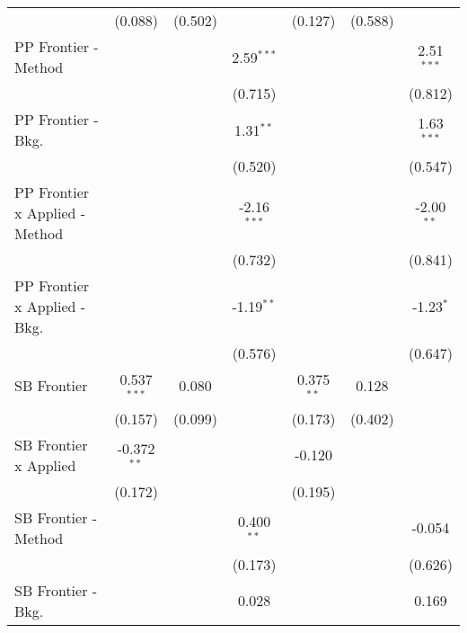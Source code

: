 \begin{tabular}{lcccccc}
                                  & (0.088)        & (0.502)       &               & (0.127)        & (0.588)       &   \\   
   PP Frontier - Method           &                &               & 2.59$^{***}$  &                &               & 2.51$^{***}$\\   
                                  &                &               & (0.715)       &                &               & (0.812)\\   
   PP Frontier - Bkg.             &                &               & 1.31$^{**}$   &                &               & 1.63$^{***}$\\   
                                  &                &               & (0.520)       &                &               & (0.547)\\   
   PP Frontier x Applied - Method &                &               & -2.16$^{***}$ &                &               & -2.00$^{**}$\\   
                                  &                &               & (0.732)       &                &               & (0.841)\\   
   PP Frontier x Applied - Bkg.   &                &               & -1.19$^{**}$  &                &               & -1.23$^{*}$\\   
                                  &                &               & (0.576)       &                &               & (0.647)\\   
   SB Frontier                    & 0.537$^{***}$  & 0.080         &               & 0.375$^{**}$   & 0.128         &   \\   
                                  & (0.157)        & (0.099)       &               & (0.173)        & (0.402)       &   \\   
   SB Frontier x Applied          & -0.372$^{**}$  &               &               & -0.120         &               &   \\   
                                  & (0.172)        &               &               & (0.195)        &               &   \\   
   SB Frontier - Method           &                &               & 0.400$^{**}$  &                &               & -0.054\\   
                                  &                &               & (0.173)       &                &               & (0.626)\\   
   SB Frontier - Bkg.             &                &               & 0.028         &                &               & 0.169\\   

\end{tabular}
